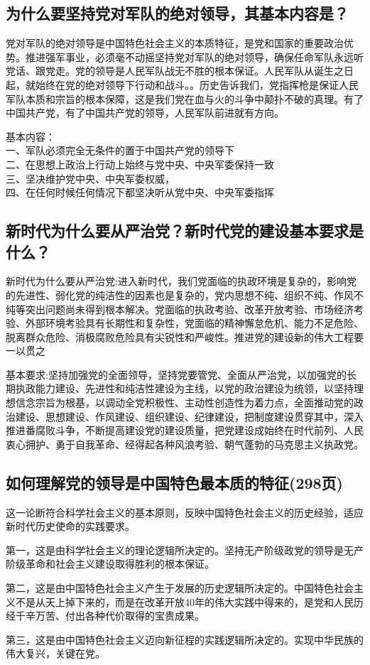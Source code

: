 \documentclass[cn,11pt]{elegantbook}
\begin{document}
\subsection{为什么要坚持党对军队的绝对领导，其基本内容是？}
{\large 

党对军队的绝对领导是中国特色社会主义的本质特征，是党和国家的重要政治优势。推进强军事业，必须毫不动摇坚持党对军队的绝对领导，确保任命军队永远听党话、跟党走。党的领导是人民军队战无不胜的根本保证。人民军队从诞生之日起，就始终在党的绝对领导下行动和战斗。。历史告诉我们，党指挥枪是保证人民军队本质和宗旨的根本保障，这是我们党在血与火的斗争中颠扑不破的真理。有了中国共产党，有了中国共产党的领导，人民军队前进就有方向。

{\heiti 基本内容：}\\一、军队必须完全无条件的置于中国共产党的领导下\\二、在思想上政治上行动上始终与党中央、中央军委保持一致
\\三、坚决维护党中央、中央军委权威，\\四、在任何时候任何情况下都坚决听从党中央、中央军委指挥}
\subsection{新时代为什么要从严治党？新时代党的建设基本要求是什么？}
{\large 
{\heiti 新时代为什么要从严治党:}进入新时代，我们党面临的执政环境是复杂的，影响党的先进性、弱化党的纯洁性的因素也是复杂的，党内思想不纯、组织不纯、作风不纯等突出问题尚未得到根本解决。党面临的执政考验、改革开放考验、市场经济考验、外部环境考验具有长期性和复杂性，党面临的精神懈怠危机、能力不足危险、脱离群众危险、消极腐败危险具有尖锐性和严峻性。推进党的建设新的伟大工程要一以贯之

{\heiti 基本要求:}坚持加强党的全面领导，坚持党要管党、全面从严治党，以加强党的长期执政能力建设、先进性和纯洁性建设为主线，以党的政治建设为统领，以坚持理想信念宗旨为根基，以调动全党积极性、主动性创造性为着力点，全面推动党的政治建设、思想建设、作风建设、组织建设、纪律建设，把制度建设贯穿其中，深入推进番腐败斗争，不断提高建设党的建设质量，把党建设成始终在时代前列、人民衷心拥护、勇于自我革命、经得起各种风浪考验、朝气蓬勃的马克思主义执政党。
}
\subsection{如何理解党的领导是中国特色最本质的特征(298页)}
{\large 
这一论断符合科学社会主义的基本原则，反映中国特色社会主义的历史经验，适应新时代历史使命的实践要求。

第一，这是由科学社会主义的理论逻辑所决定的。坚持无产阶级政党的领导是无产阶级革命和社会主义建设取得胜利的根本保证。

第二，这是由中国特色社会主义产生于发展的历史逻辑所决定的。中国特色社会主义不是从天上掉下来的，而是在改革开放40年的伟大实践中得来的，是党和人民历经千辛万苦、付出各种代价取得的宝贵成果。

第三，这是由中国特色社会主义迈向新征程的实践逻辑所决定的。实现中华民族的伟大复兴，关键在党。
}
\end{document}
